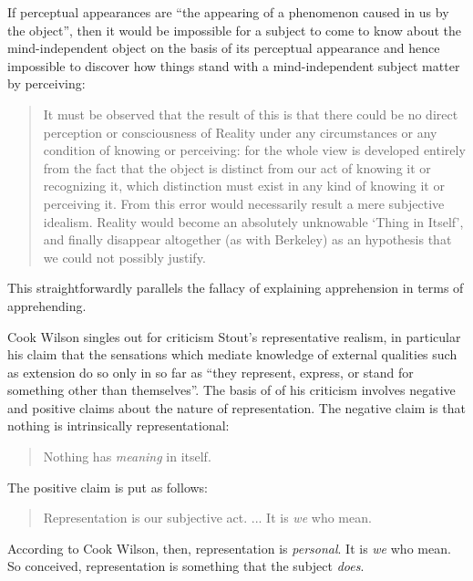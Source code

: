 If perceptual appearances are ``the appearing of a phenomenon caused in us by the object'', then it would be impossible for a subject to come to know about the mind-independent object on the basis of its perceptual appearance and hence impossible to discover how things stand with a mind-independent subject matter by perceiving:
\begin{quote}
	It must be observed that the result of this is that there could be no direct perception or consciousness of Reality under any circumstances or any condition of knowing or perceiving: for the whole view is developed entirely from the fact that the object is distinct from our act of knowing it or recognizing it, which distinction must exist in any kind of knowing it or perceiving it. From this error would necessarily result a mere subjective idealism. Reality would become an absolutely unknowable `Thing in Itself', and finally disappear altogether (as with Berkeley) as an hypothesis that we could not possibly justify. \citep[797]{Cook-Wilson:1926sf}
\end{quote}
This straightforwardly parallels the fallacy of explaining apprehension in terms of apprehending. 

Cook Wilson singles out for criticism Stout’s representative realism, in particular his claim that the sensations which mediate knowledge of external qualities such as extension do so only in so far as ``they represent, express, or stand for something other than themselves''. The basis of of his criticism involves negative and positive claims about the nature of representation. The negative claim is that nothing is intrinsically representational:
\begin{quote}
	Nothing has \emph{meaning} in itself. \citep[]{Cook-Wilson:1926sf}
\end{quote}
The positive claim is put as follows: 
\begin{quote}
	Representation is our subjective act. ... It is \emph{we} who mean.  \citep[]{Cook-Wilson:1926sf}
\end{quote}
According to Cook Wilson, then, representation is \emph{personal}. It is \emph{we} who mean. So conceived, representation is something that the subject \emph{does}. 

